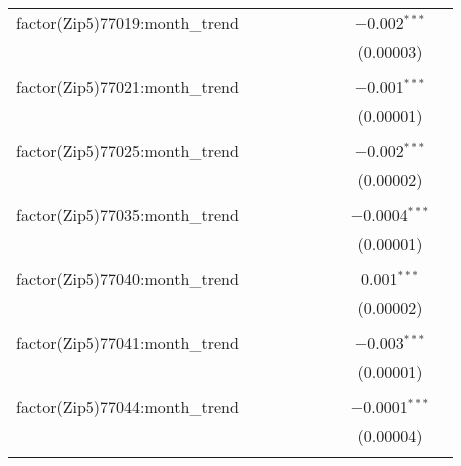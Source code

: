 \begin{table}[H]
{\begin{tabular}{@{\extracolsep{5pt}}lcccccccc}
  factor(Zip5)77019:month\_trend &  &  &  &  &  &  & $-$0.002$^{***}$ &  \\  

   &  &  &  &  &  &  & (0.00003) &  \\  

   & & & & & & & & \\  

  factor(Zip5)77021:month\_trend &  &  &  &  &  &  & $-$0.001$^{***}$ &  \\  

   &  &  &  &  &  &  & (0.00001) &  \\  

   & & & & & & & & \\  

  factor(Zip5)77025:month\_trend &  &  &  &  &  &  & $-$0.002$^{***}$ &  \\  

   &  &  &  &  &  &  & (0.00002) &  \\  

   & & & & & & & & \\  

  factor(Zip5)77035:month\_trend &  &  &  &  &  &  & $-$0.0004$^{***}$ &  \\  

   &  &  &  &  &  &  & (0.00001) &  \\  

   & & & & & & & & \\  

  factor(Zip5)77040:month\_trend &  &  &  &  &  &  & 0.001$^{***}$ &  \\  

   &  &  &  &  &  &  & (0.00002) &  \\  

   & & & & & & & & \\  

  factor(Zip5)77041:month\_trend &  &  &  &  &  &  & $-$0.003$^{***}$ &  \\  

   &  &  &  &  &  &  & (0.00001) &  \\  

   & & & & & & & & \\  

  factor(Zip5)77044:month\_trend &  &  &  &  &  &  & $-$0.0001$^{***}$ &  \\  

   &  &  &  &  &  &  & (0.00004) &  \\  

   & & & & & & & & \\  


\end{tabular}}
\end{table}

